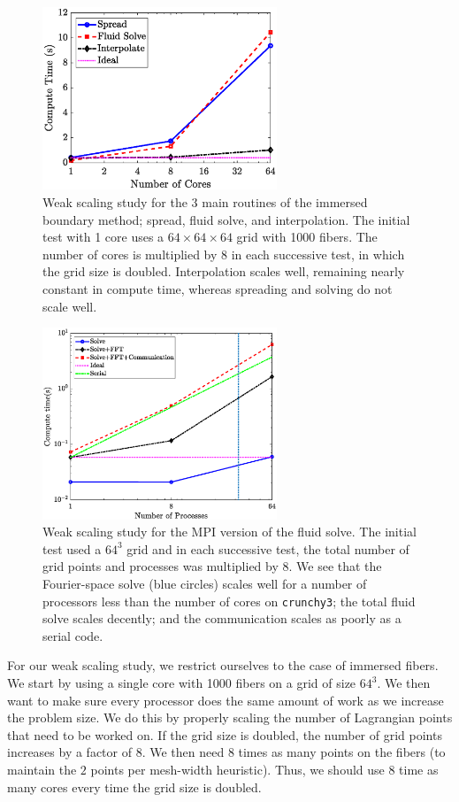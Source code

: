 \documentclass[]{article}
\begin{document}
\begin{figure}
	\centering     
	\includegraphics[width=70mm]{WeakScFibers.eps}
\caption{Weak scaling study for the 3 main routines of the immersed boundary method; spread, fluid solve, and interpolation. The initial test with 1 core uses a $64\times64\times64$ grid with 1000 fibers.  The number of cores is multiplied by $8$ in each successive test, in which the grid size is doubled. Interpolation scales well, remaining nearly constant in compute time, whereas spreading and solving do not scale well.}
\label{fig:Weak}
\end{figure}
\begin{figure}
	\centering     
	\includegraphics[width=70mm]{WeakMPI.eps}
\caption{Weak scaling study for the MPI version of the fluid solve. The initial test used a $64^3$ grid and in each successive test, the total number of grid points and processes was multiplied by 8. We see that the Fourier-space solve (blue circles) scales well for a number of processors less than the number of cores on \texttt{crunchy3}; the total fluid solve scales decently; and the communication scales as poorly as a serial code.}
\label{fig:WeakMPI}
\end{figure}
For our weak scaling study, we restrict ourselves to the case of immersed fibers. We start by using a single core with 1000 fibers on a grid of size $64^3$. We then want to make sure every processor does the same amount of work as we increase the problem size. We do this by properly scaling the number of Lagrangian points that need to be worked on. If the grid size is doubled, the number of grid points increases by a factor of 8. We then need $8$ times as many points on the fibers (to maintain the $2$ points per mesh-width heuristic). Thus, we should use $8$ time as many cores every time the grid size is doubled. 
\end{document}

